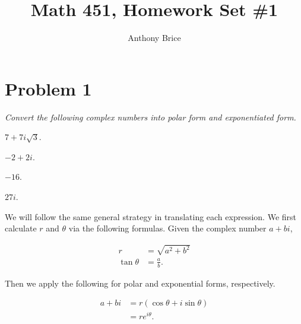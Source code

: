 \documentclass{tufte-handout}
\title{Math 451, Homework Set \#1}
\author{Anthony Brice}
\begin{document}
\maketitle

\section{Problem 1}

\begin{description}
\item \textit{Convert the following complex numbers into polar form
    and exponentiated form.}
\item[(a)] $7 + 7i\sqrt{3}$.
\item[(b)] $-2 + 2i$.
\item[(c)] $-16$.
\item[(d)] $27i$.
\end{description}

We will follow the same general strategy in translating each
expression. We first calculate $r$ and $\theta$ via the following
formulas. Given the complex number $a + bi$,

\begin{align*}
  r &= \sqrt{a^2 + b^2}\\
  \tan \theta &= \frac{a}{b}.
\end{align*}

Then we apply the following for polar and exponential forms, respectively.

\begin{align*}
  a + bi &= r \left( \cos \theta + i \sin \theta \right)\\
         &= r e^{i \theta}.
\end{align*}
\end{document}
